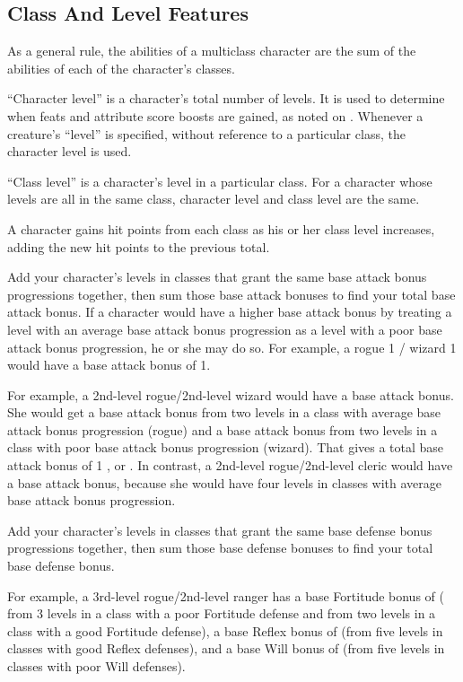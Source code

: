 \subsection{Class And Level Features}
As a general rule, the abilities of a multiclass character are the sum
of the abilities of each of the character's classes.

``Character level'' is a character's total number of levels.
It is used to determine when feats and attribute score boosts are gained, as noted on .
Whenever a creature's ``level'' is specified, without reference to a particular class, the character level is used.

\par ``Class level'' is a character's level in a particular class.
For a character whose levels are all in the same class, character level and class level are the same.

A character gains hit points from each class as his or her class level increases, adding the new hit points to the previous total.

Add your character's levels in classes that grant the same base attack bonus progressions together, then sum those base attack bonuses to find your total base attack bonus.
If a character would have a higher base attack bonus by treating a level with an average base attack bonus progression as a level with a poor base attack bonus progression, he or she may do so.
For example, a rogue 1 / wizard 1 would have a base attack bonus of 1.

\par For example, a 2nd-level rogue/2nd-level wizard would have a  base attack bonus.
She would get a  base attack bonus from two levels in a class with average base attack bonus progression (rogue) and a  base attack bonus from two levels in a class with poor base attack bonus progression (wizard).
That gives a total base attack bonus of 1 , or .
In contrast, a 2nd-level rogue/2nd-level cleric would have a  base attack bonus, because she would have four levels in classes with average base attack bonus progression.

Add your character's levels in classes that grant the same base defense bonus progressions together, then sum those base defense bonuses to find your total base defense bonus.

\par For example, a 3rd-level rogue/2nd-level ranger has a base Fortitude bonus of  ( from 3 levels in a class with a poor Fortitude defense and  from two levels in a class with a good Fortitude defense), a base Reflex bonus of  (from five levels in classes with good Reflex defenses), and a base Will bonus of  (from five levels in classes with poor Will defenses).

